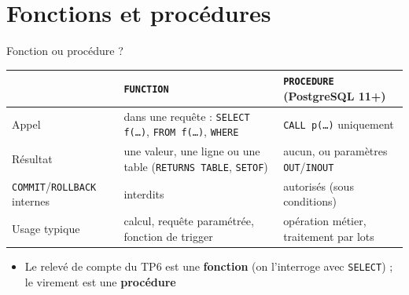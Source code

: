 \documentclass[aspectratio=169,10pt]{beamer}
\begin{document}
\section{Fonctions et proc\'edures}

\begin{frame}{Fonction ou proc\'edure ?}
  \begin{datacard}
    \small
    \begin{tabular}{@{}p{3.3cm}p{4.6cm}p{4.6cm}@{}}
      \toprule
       & \textbf{\texttt{FUNCTION}} & \textbf{\texttt{PROCEDURE}} (PostgreSQL 11+) \\
      \midrule
      Appel & dans une requ\^ete : \texttt{SELECT f(\ldots)}, \texttt{FROM f(\ldots)}, \texttt{WHERE} & \texttt{CALL p(\ldots)} uniquement \\
      R\'esultat & une valeur, une ligne ou une table (\texttt{RETURNS TABLE}, \texttt{SETOF}) & aucun, ou param\`etres \texttt{OUT}/\texttt{INOUT} \\
      \texttt{COMMIT}/\texttt{ROLLBACK} internes & \alert{interdits} & autoris\'es (sous conditions) \\
      Usage typique & calcul, requ\^ete param\'etr\'ee, fonction de trigger & op\'eration m\'etier, traitement par lots \\
      \bottomrule
    \end{tabular}
  \end{datacard}
  \vspace{2mm}
  \begin{itemize}
    \item Le relev\'e de compte du TP6 est une \textbf{fonction} (on l'interroge avec \texttt{SELECT}) ; le virement est une \textbf{proc\'edure}
  \end{itemize}
\end{frame}
\end{document}
